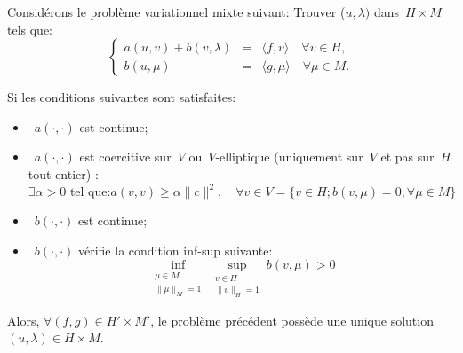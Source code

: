 \label{Sec:Brezzi}

\medskip
\begin{theoreme}
Considérons le problème variationnel mixte suivant:
Trouver ($u, \lambda)$ dans~$H\times M$ tels que:
 \begin{equation}\label{Eq-PM}\left\{
\begin{array}{rcl}
 a(u,v) + b(v, \lambda) &=& \langle f,v\rangle \quad \forall v\in H,\\
b(u,\mu) &=& \langle g,\mu\rangle \quad \forall \mu \in M.
\end{array}\right.
\end{equation}

Si les conditions suivantes sont satisfaites:
\begin{itemize}
  \item~$a(\cdot,\cdot)$ est continue;
  \item~$a(\cdot,\cdot)$ est coercitive sur~$V$ ou~$V$-elliptique (uniquement sur~$V$ et pas sur~$H$ tout entier) :
  \begin{equation}\exists \alpha> 0 \text{ tel que:} a(v,v)\ge\alpha\|c\|^2, \quad \forall v\in V=\{v\in H; b(v,\mu)=0, \forall \mu\in M \}\end{equation}
  \item~$b(\cdot,\cdot)$ est continue;
  \item~$b(\cdot,\cdot)$ vérifie la condition inf-sup suivante:
\begin{equation}\inf_{\substack{\mu\in M\\\|\mu\|_M=1}} \sup_{\substack{v\in H\\\|v\|_H=1}} b(v,\mu) > 0\end{equation}
\end{itemize}
Alors, $\forall (f,g)\in H'\times M'$, le problème précédent possède une unique solution
$(u,\lambda) \in H\times M$.
\end{theoreme}

\medskip
{}



